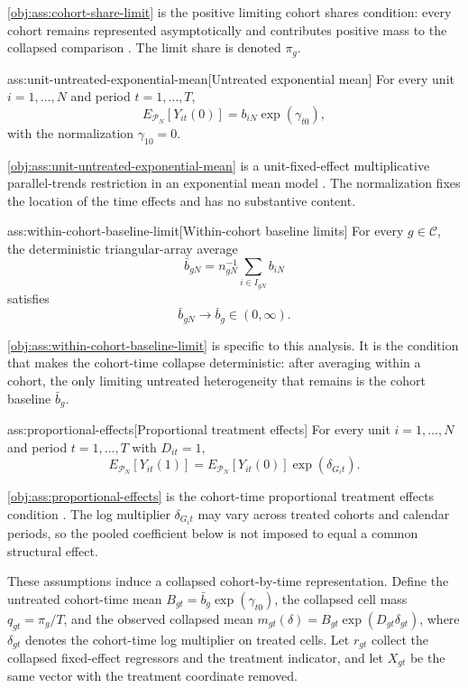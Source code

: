 \cref{obj:ass:cohort-share-limit} is the positive limiting cohort shares condition: every cohort remains represented asymptotically and contributes positive mass to the collapsed comparison \citep{deChaisemartinDHaultfoeuille2020TWFE}. The limit share is denoted \(\pi_g\).

\begin{assumptionv}{ass:unit-untreated-exponential-mean}[Untreated exponential mean]
For every unit \(i=1,\ldots,N\) and period \(t=1,\ldots,T\),
\[
E_{\mathcal P_N}\!\left[Y_{it}(0)\right]
=
b_{iN}\exp(\gamma_{t0}),
\]
with the normalization \(\gamma_{10}=0\).
\end{assumptionv}

\cref{obj:ass:unit-untreated-exponential-mean} is a unit-fixed-effect multiplicative parallel-trends restriction in an exponential mean model \citep{Wooldridge2023NonlinearDiD}. The normalization fixes the location of the time effects and has no substantive content.

\begin{assumptionv}{ass:within-cohort-baseline-limit}[Within-cohort baseline limits]
For every \(g\in\mathcal C\), the deterministic triangular-array average
\[
\bar b_{gN}
=
n_{gN}^{-1}\sum_{i\in I_{gN}} b_{iN}
\]
satisfies
\[
\bar b_{gN}\to \bar b_g\in(0,\infty).
\]
\end{assumptionv}

\cref{obj:ass:within-cohort-baseline-limit} is specific to this analysis. It is the condition that makes the cohort-time collapse deterministic: after averaging within a cohort, the only limiting untreated heterogeneity that remains is the cohort baseline \(\bar b_g\).

\begin{assumptionv}{ass:proportional-effects}[Proportional treatment effects]
For every unit \(i=1,\ldots,N\) and period \(t=1,\ldots,T\) with \(D_{it}=1\),
\[
E_{\mathcal P_N}\!\left[Y_{it}(1)\right]
=
E_{\mathcal P_N}\!\left[Y_{it}(0)\right]\exp(\delta_{G_i t}).
\]
\end{assumptionv}

\cref{obj:ass:proportional-effects} is the cohort-time proportional treatment effects condition \citep{MoreauKastler2025PTT}. The log multiplier \(\delta_{G_i t}\) may vary across treated cohorts and calendar periods, so the pooled coefficient below is not imposed to equal a common structural effect.

These assumptions induce a collapsed cohort-by-time representation. Define the untreated cohort-time mean \(B_{gt}=\bar b_g\exp(\gamma_{t0})\), the collapsed cell mass \(q_{gt}=\pi_g/T\), and the observed collapsed mean \(m_{gt}(\delta)=B_{gt}\exp(D_{gt}\delta_{gt})\), where \(\delta_{gt}\) denotes the cohort-time log multiplier on treated cells. Let \(r_{gt}\) collect the collapsed fixed-effect regressors and the treatment indicator, and let \(X_{gt}\) be the same vector with the treatment coordinate removed.

